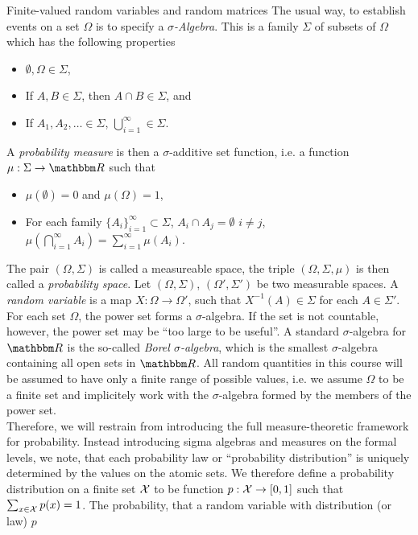  \begin{section}{Finite-valued random variables and random matrices}
  The usual way, to establish events on a set $\Omega$ is to specify a \emph{$\sigma$-Algebra}. This is a family $\Sigma$ of subsets of $\Omega$ which has the following properties
  \begin{itemize} 
   \item $\emptyset,  \Omega \in \Sigma$, 
   \item If $A, B \in \Sigma$, then $A \cap B \in \Sigma$, and 
   \item If $A_1,A_2,\dots \in \Sigma$, $\bigcup_{i=1}^\infty \in \Sigma$.
  \end{itemize}
  A \emph{probability measure} is then a $\sigma$-additive set function, i.e. a function $\mu: \Sigma \rightarrow \bbmR$ such that 
  \begin{itemize}
   \item $\mu(\emptyset) = 0$ and $\mu(\Omega) = 1$, 
   \item For each family $\{A_i\}_{i=1}^\infty \subset \Sigma$, $A_i \cap A_j = \emptyset$ $i \neq j$, $\mu(\bigcap_{i=1}^\infty A_i) = \sum_{i=1}^\infty \mu(A_i)$. 
  \end{itemize}
  The pair $(\Omega,\Sigma)$ is called a measureable space, the triple $(\Omega, \Sigma, \mu)$ is then called a \emph{probability space}. Let $(\Omega, \Sigma)$, $(\Omega', \Sigma')$ 
  be two measurable spaces. A \emph{random variable} is a map $X: \Omega \rightarrow \Omega'$, such that $X^{-1}(A) \in \Sigma$ for each $A \in \Sigma'$. For each set $\Omega$, the power 
  set forms a $\sigma$-algebra. If the set is not countable, however, the power set may be ``too large to be useful''. A standard $\sigma$-algebra for $\bbmR$ is the so-called \emph{Borel $\sigma$-algebra}, 
  which is the smallest $\sigma$-algebra containing all open sets in $\bbmR$. 
  All random quantities in this course will be assumed to have only a finite range of possible values, i.e. we assume $\Omega$ to be a finite set and implicitely work with the $\sigma$-algebra formed by the 
  members of the power set. \\
  Therefore, we will restrain from introducing the full measure-theoretic framework for probability. 
  Instead introducing sigma algebras and measures on the formal levels, we note, that each probability law or ``probability distribution'' is uniquely determined by the values on the atomic sets. We therefore
  define a probability distribution on a finite set ${\mathcal X}$ to be function $p: {\mathcal X} \rightarrow [0,1]$ such that $\sum_{x \in {\mathcal X}} p(x) = 1$. The probability, that a random variable with distribution (or law) $p$ 

\end{section}
